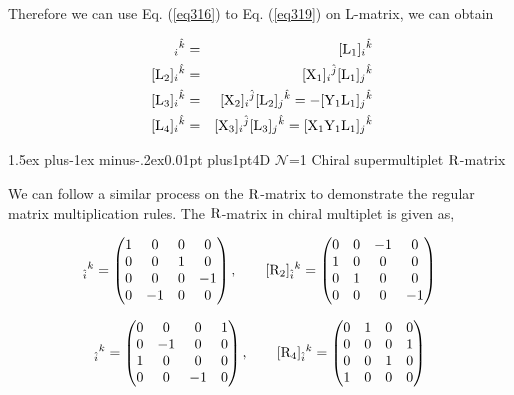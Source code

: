 \documentclass[12pt]{article}
\makeatletter
\def\rL{{\rm L}}
\def\rR{{\rm R}}
\let\bm\relax
\newcommand{\bm}[1]{{\boldsymbol{#1}}}
\def\subsection{\@startsection{subsection}{2}{\z@}
         {1.5ex plus-1ex minus-.2ex}{0.01pt plus1pt}{\sf\slshape}}
\makeatother
\begin{document}
Therefore we can use Eq. (\ref{eq316}) to Eq. (\ref{eq319}) on L-matrix, we can obtain 

\begin{eqnarray}
[{\bm \rL}_1]_{i}{}^{\hat k}&=&[{\bm \rL}_1]_{i}{}^{\hat k}\nonumber\\
\
[{\bm \rL}_2]_{i}{}^{\hat k}&=&[{\bm{\rm X}}_1]_{i}{}^{\hat j}[{\bm \rL}_1]_{j}{}^{\hat k}\nonumber\\
\
[{\bm \rL}_3]_{i}{}^{\hat k}&=&[{\bm{\rm X}}_2]_{i}{}^{\hat j}[{\bm \rL}_2]_{j}{}^{\hat k}=-[\bm{\rm Y_1L_1}]_{j}{}^{\hat k}\nonumber\\
\
[{\bm \rL}_4]_{i}{}^{\hat k}&=&[{\bm{\rm X}}_3]_{i}{}^{\hat j}[{\bm \rL}_3]_{j}{}^{\hat k}=[\bm{\rm X_1Y_1L_1}]_{j}{}^{\hat k}
\label{eq8.24}
\end{eqnarray}








\subsection{4D $\mathcal{N}$=1 Chiral supermultiplet $\bm\rR$-matrix}

We can follow a similar process on the $\bm\rR$-matrix to demonstrate the regular matrix multiplication rules. The $\bm\rR$-matrix in chiral multiplet is given as, \cite{3}

\begin{equation}
[{\bm \rR}_1]_{\hat i}{}^{k}=
\begin{pmatrix}
1 & 0 & 0 & 0 \\
0 & 0 & 1 & 0 \\
0 & 0 & 0 & -1 \\
0 & -1 & 0 & 0 \\
\end{pmatrix}
,\quad\quad
[{\bm \rR}_2]_{\hat i}{}^{k}=
\begin{pmatrix}
0 & 0 & -1 & 0 \\
1 & 0 & 0 & 0 \\
0 & 1 & 0 & 0 \\
0 & 0 & 0 & -1 \\
\end{pmatrix}
\end{equation}

\begin{equation}
[{\bm{\rR}}_3]_{\hat i}{}^{k}=
\begin{pmatrix}
0 & 0 & 0 & 1 \\
0 & -1 & 0 & 0 \\
1 & 0 & 0 & 0 \\
0 & 0 & -1 & 0 \\
\end{pmatrix}
,\quad\quad
[{\bm{\rR}}_4]_{\hat i}{}^{k}=
\begin{pmatrix}
0 & 1 & 0 & 0 \\
0 & 0 & 0 & 1 \\
0 & 0 & 1 & 0 \\
1 & 0 & 0 & 0 \\
\end{pmatrix}
\end{equation}
\end{document}
